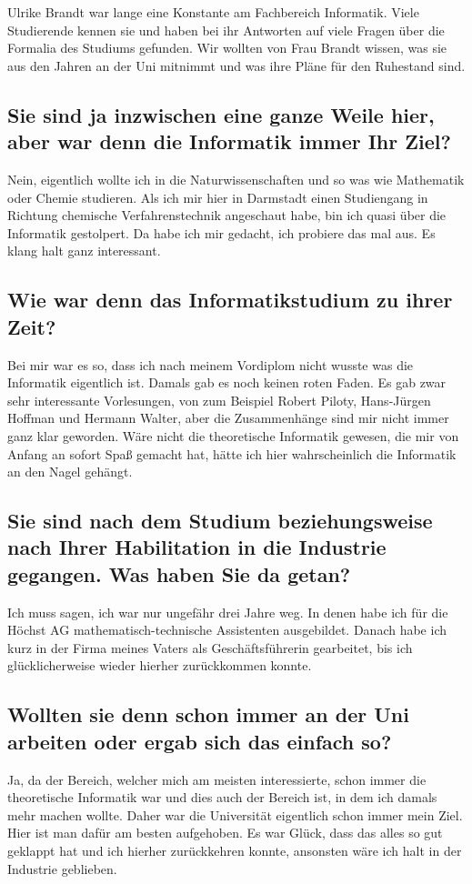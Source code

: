 {Ulrike Brandt war lange eine Konstante am Fachbereich Informatik. Viele Studierende kennen sie und haben bei ihr Antworten auf viele Fragen über die Formalia des Studiums gefunden. Wir wollten von Frau Brandt wissen, was sie aus den Jahren an der Uni mitnimmt und was ihre Pläne für den Ruhestand sind.
}
{
\subsection*{Sie sind ja inzwischen eine ganze Weile hier, aber war denn die Informatik immer Ihr Ziel?}
Nein, eigentlich wollte ich in die Naturwissenschaften und so was wie Mathematik oder Chemie studieren. 
Als ich mir hier in Darmstadt einen Studiengang in Richtung chemische Verfahrenstechnik angeschaut habe, bin ich quasi über die Informatik gestolpert. Da habe ich mir gedacht, ich probiere das mal aus. Es klang halt ganz interessant.
\subsection*{Wie war denn das Informatikstudium zu ihrer Zeit?}
Bei mir war es so, dass ich nach meinem Vordiplom nicht wusste was die Informatik eigentlich ist. Damals gab es noch keinen roten Faden. Es gab zwar sehr interessante Vorlesungen, von zum Beispiel Robert Piloty, Hans-Jürgen Hoffman und Hermann Walter, aber die Zusammenhänge sind mir nicht immer ganz klar geworden. Wäre nicht die theoretische Informatik gewesen, die mir von Anfang an sofort Spaß gemacht hat, hätte ich hier wahrscheinlich die Informatik an den Nagel gehängt.
\subsection*{Sie sind nach dem Studium beziehungsweise nach Ihrer Habilitation in die Industrie gegangen. Was haben Sie da getan?}
Ich muss sagen, ich war nur ungefähr drei Jahre weg. In denen habe ich für die Höchst AG mathematisch-technische Assistenten ausgebildet. Danach habe ich kurz in der Firma meines Vaters als Geschäftsführerin gearbeitet, bis ich glücklicherweise wieder hierher zurückkommen konnte.
\subsection*{Wollten sie denn schon immer an der Uni arbeiten oder ergab sich das einfach so?}
Ja, da der Bereich, welcher mich am meisten interessierte, schon immer die theoretische Informatik war und dies auch der Bereich ist, in dem ich damals mehr machen wollte. Daher war die Universität eigentlich schon immer mein Ziel. Hier ist man dafür am besten aufgehoben. Es war Glück, dass das alles so gut geklappt hat und ich hierher zurückkehren konnte, ansonsten wäre ich halt in der Industrie geblieben.
}
